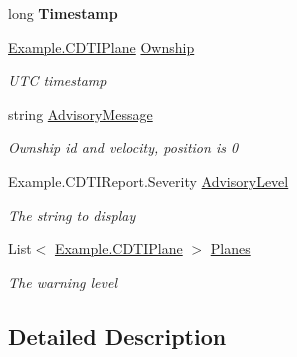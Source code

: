 \begin{DoxyCompactItemize}
\item 
\hypertarget{class_example_1_1_c_d_t_i_report_a610c0a065465b2c5d1d97aff3cf83b07}{}long {\bfseries Timestamp}\label{class_example_1_1_c_d_t_i_report_a610c0a065465b2c5d1d97aff3cf83b07}

\item 
\hyperlink{class_example_1_1_c_d_t_i_plane}{Example.\+C\+D\+T\+I\+Plane} \hyperlink{class_example_1_1_c_d_t_i_report_a069e31165b27ca17ba6efa26fdb763bd}{Ownship}
\begin{DoxyCompactList}\small\item\em U\+T\+C timestamp\end{DoxyCompactList}\item 
string \hyperlink{class_example_1_1_c_d_t_i_report_aee90e745d98baa176941e916999248d9}{Advisory\+Message}
\begin{DoxyCompactList}\small\item\em Ownship id and velocity, position is 0\end{DoxyCompactList}\item 
Example.\+C\+D\+T\+I\+Report.\+Severity \hyperlink{class_example_1_1_c_d_t_i_report_a883863fdf0a9f3ebc64e0a6fa277a330}{Advisory\+Level}
\begin{DoxyCompactList}\small\item\em The string to display\end{DoxyCompactList}\item 
List$<$ \hyperlink{class_example_1_1_c_d_t_i_plane}{Example.\+C\+D\+T\+I\+Plane} $>$ \hyperlink{class_example_1_1_c_d_t_i_report_adeeec29b233bde873045cf173c7b462e}{Planes}
\begin{DoxyCompactList}\small\item\em The warning level\end{DoxyCompactList}\end{DoxyCompactItemize}


\subsection{Detailed Description}


